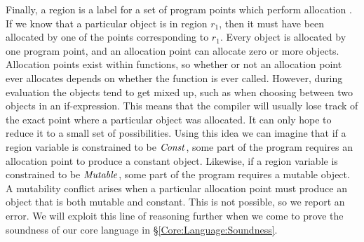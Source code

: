 Finally, a region is a label for a set of program points which perform allocation \cite{pierce:atapl}. If we know that a particular object is in region $r_1$, then it must have been allocated by one of the points corresponding to $r_1$. Every object is allocated by one program point, and an allocation point can allocate zero or more objects. Allocation points exist within functions, so whether or not an allocation point ever allocates depends on whether the function is ever called. However, during evaluation the objects tend to get mixed up, such as when choosing between two objects in an if-expression. This means that the compiler will usually lose track of the exact point where a particular object was allocated. It can only hope to reduce it to a small set of possibilities.  Using this idea we can imagine that if a region variable is constrained to be $\operatorname{\mathit{Const}}$, some part of the program requires an allocation point to produce a constant object. Likewise, if a region variable is constrained to be $\operatorname{\mathit{Mutable}}$, some part of the program requires a mutable object. A mutability conflict arises when a particular allocation point must produce an object that is both mutable and constant. This is not possible, so we report an error. We will exploit this line of reasoning further when we come to prove the soundness of our core language in \S\ref{Core:Language:Soundness}.


